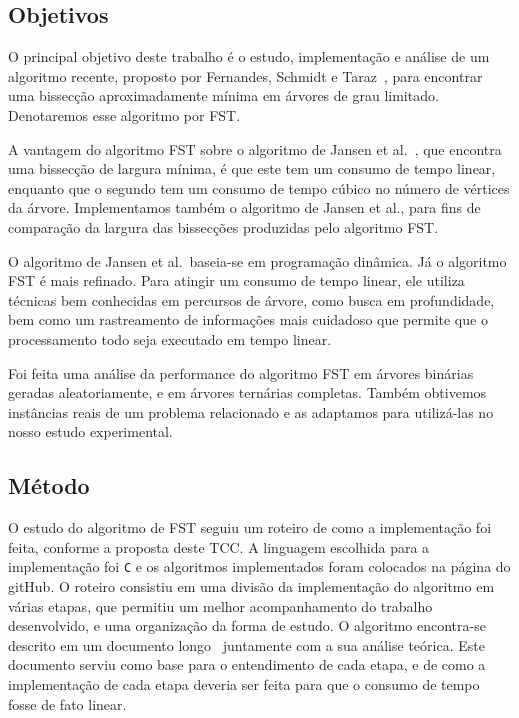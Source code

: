 \subsection{Objetivos} 

O principal objetivo deste trabalho é o estudo, implementação e 
análise de um algoritmo recente, proposto por Fernandes, Schmidt e 
Taraz~\cite{FernandesST13}, para encontrar uma bissecção 
aproximadamente mínima em árvores de grau limitado. Denotaremos
esse algoritmo por FST. 

A vantagem do algoritmo FST sobre o algoritmo de Jansen et 
al.~\cite{JansenKLS01}, que encontra uma bissecção de largura 
mínima, é que este tem um consumo de tempo linear, enquanto que o 
segundo tem um consumo de tempo cúbico no número de vértices da 
árvore. 
Implementamos também o algoritmo de Jansen et al., para fins de 
comparação da largura das bissecções produzidas pelo algoritmo
FST. 

O algoritmo de Jansen et al.\ baseia-se em 
programação dinâmica. 
Já o algoritmo FST é mais refinado. 
Para atingir um consumo de tempo 
linear, ele utiliza técnicas bem conhecidas em percursos de árvore, 
como busca em profundidade, bem como um rastreamento de 
informações mais cuidadoso que permite que o processamento todo 
seja executado em tempo linear. 

Foi feita uma análise 
da performance do algoritmo FST em árvores binárias geradas 
aleatoriamente, e 
em árvores ternárias completas.
Também obtivemos instâncias reais de um problema relacionado e as
adaptamos para 
utilizá-las no nosso estudo experimental.
 

\bigskip
\bigskip


\subsection{Método}

O estudo do algoritmo de FST seguiu um roteiro de
como a implementação foi feita, conforme a proposta deste TCC. 
A linguagem escolhida para a implementação foi \texttt{C} e os 
algoritmos implementados foram colocados na página do gitHub. 
O roteiro consistiu em uma divisão da implementação do algoritmo 
em várias etapas, que permitiu um melhor acompanhamento do 
trabalho desenvolvido, e uma organização da forma de estudo. 
O algoritmo encontra-se descrito em um documento 
longo~\cite{Schmidt15} juntamente com a sua análise teórica. 
Este documento serviu como base para o entendimento de cada 
etapa, e de como a implementação de cada etapa deveria ser feita 
para que o consumo de tempo fosse de fato linear. 

